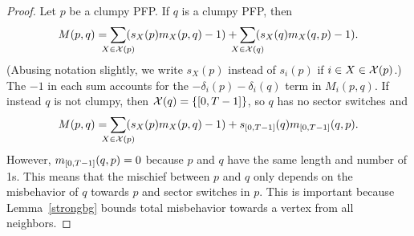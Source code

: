 \begin{proof}
Let $p$ be a clumpy PFP. If $q$ is a clumpy PFP, then
\begin{equation}\label{misbSub1}
  M(p,q) =
  \smashoperator{\sum_{X \in \sctr{p}}}(s_X(p)\misb{X}{p}{q} - 1) +
  \smashoperator{\sum_{X \in \sctr{q}}}(s_X(q)\misb{X}{q}{p} - 1).
\end{equation}
(Abusing notation slightly, we write $s_X(p)$ instead of $s_i(p)$ if $i \in X
\in \mathcal{X}(p)$.) The $-1$ in each sum accounts for the
$-\delta_i(p)-\delta_i(q)$ term in $M_i(p,q)$. If instead $q$ is not clumpy,
then $\sctr{q} = \{[0,\period-1]\}$, so $q$ has no sector switches and
\begin{equation}\label{misbSub2}
  M(p,q) =
  \smashoperator{\sum_{X \in \sctr{p}}}(s_X(p)\misb{X}{p}{q} - 1) +
  s_{[0,\period-1]}(q)\misb{[0,\period-1]}{q}{p}.
\end{equation}
However, $\misb{[0,\period-1]}{q}{p} = 0$ because $p$ and $q$ have the same
length and number of 1s. This means that the mischief between $p$ and $q$ only
depends on the misbehavior of $q$ towards $p$ and sector switches in $p$. This
is important because Lemma~\ref{strongbg} bounds total misbehavior towards a
vertex from all neighbors.


\end{proof}
